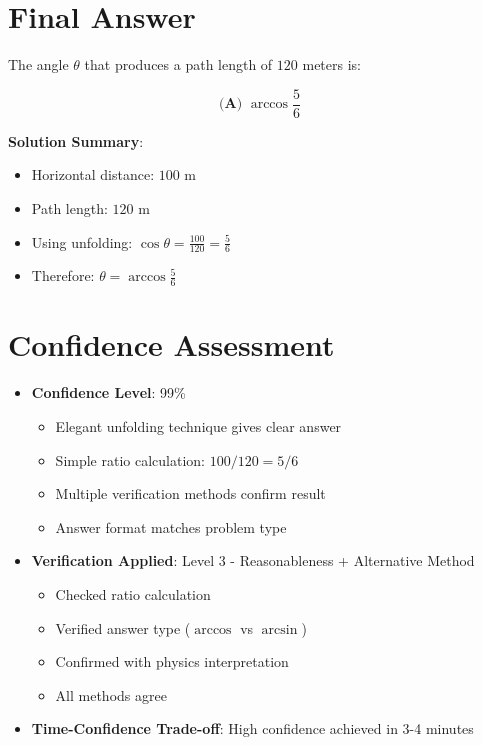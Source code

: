 \documentclass[11pt]{article}
\begin{document}
\section*{Final Answer}

The angle $\theta$ that produces a path length of $120$ meters is:

\[\boxed{\textbf{(A) } \arccos\frac{5}{6}}\]

\textbf{Solution Summary}:
\begin{itemize}
    \item Horizontal distance: $100$ m
    \item Path length: $120$ m
    \item Using unfolding: $\cos\theta = \frac{100}{120} = \frac{5}{6}$
    \item Therefore: $\theta = \arccos\frac{5}{6}$
\end{itemize}

\section*{Confidence Assessment}
\begin{itemize}[leftmargin=*]
    \item \textbf{Confidence Level}: 99\%
    \begin{itemize}
        \item Elegant unfolding technique gives clear answer
        \item Simple ratio calculation: $100/120 = 5/6$
        \item Multiple verification methods confirm result
        \item Answer format matches problem type
    \end{itemize}
    \item \textbf{Verification Applied}: Level 3 - Reasonableness + Alternative Method
    \begin{itemize}
        \item Checked ratio calculation
        \item Verified answer type ($\arccos$ vs $\arcsin$)
        \item Confirmed with physics interpretation
        \item All methods agree
    \end{itemize}
    \item \textbf{Time-Confidence Trade-off}: High confidence achieved in 3-4 minutes
\end{itemize}
\end{document}
